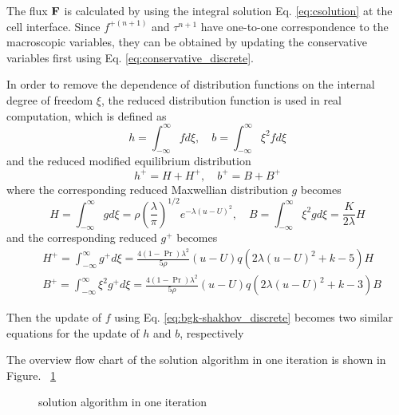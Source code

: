 \documentclass[a4paper]{book}
\begin{document}
The flux ${\bf F}$ is calculated by using the integral solution Eq. \ref{eq:csolution} at the cell interface. Since $f^{+(n+1)}$ and $\tau^{n+1}$ have one-to-one correspondence to the macroscopic variables, they can be obtained by updating the conservative variables first using Eq. \ref{eq:conservative_discrete}.

In order to remove the dependence of distribution functions on the internal degree of freedom $\xi$, the reduced distribution function \cite{Yang1995} is used in real computation, which is defined as
\begin{equation} 
    h = \int_{-\infty}^{\infty}fd\xi,\quad b = \int_{-\infty}^{\infty}\xi^2 f d\xi
\end{equation} 
and the reduced modified equilibrium distribution 
$$h^+ = H+H^+,\quad b^+ = B+B^+$$
where the corresponding reduced Maxwellian distribution $g$ becomes
\begin{equation} 
    \label{eq:reduced_g}
    H = \int_{-\infty}^{\infty}gd\xi = \rho\left(\frac{\lambda}{\pi}\right)^{1/2}e^{-\lambda(u-U)^2},\quad B = \int_{-\infty}^{\infty}\xi^2 gd\xi =\frac{K}{2\lambda}H
\end{equation}
and the corresponding reduced $g^+$ becomes
\begin{equation}
    \label{eq:reduced_gp}
    \begin{aligned}
        & H^+ = \int_{-\infty}^{\infty}g^+d\xi = \frac{4(1-\Pr)\lambda^2}{5\rho}(u-U)q(2\lambda(u-U)^2+k-5)H \\
        & B^+ = \int_{-\infty}^{\infty}\xi^2g^+d\xi = \frac{4(1-\Pr)\lambda^2}{5\rho}(u-U)q(2\lambda(u-U)^2+k-3)B
    \end{aligned}
\end{equation}

Then the update of $f$ using Eq. \ref{eq:bgk-shakhov_discrete} becomes two similar equations for the update of $h$ and $b$, respectively

The overview flow chart of the solution algorithm in one iteration is shown in Figure. ~\ref{pic:solution}

\begin{figure}[htb!]
    \centering
    \caption{solution algorithm in one iteration}
    \label{pic:solution}
\end{figure}
\end{document}
